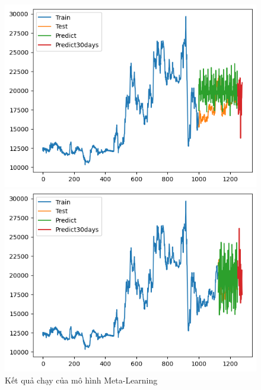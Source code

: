 \begin{figure}[H]
\begin{minipage}{0.15\textwidth}
    \includegraphics[width=1\textwidth]{resources/chapter-5/result/EXB_ML_8_2.png}
    \end{minipage}
    \hfill
        \begin{minipage}{0.15\textwidth}
    \centering
    \includegraphics[width=1\textwidth]{resources/chapter-5/result/EXB_ML_9_1.png}
    \end{minipage}
    \hfill
    
    \caption{Kết quả chạy của mô hình Meta-Learning}
    \label{fig:ml_result}
\end{figure}



